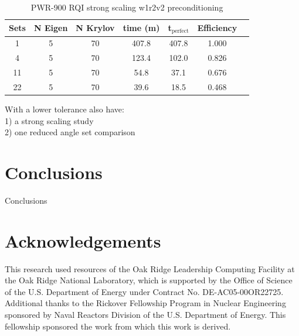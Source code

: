 \documentclass[preprint,12pt]{elsarticle}
\begin{document}
\begin{table}[!h]
\caption{PWR-900 RQI strong scaling w1r2v2 preconditioning}
\label{tab:PWR rqi strong scaling}
  \begin{center}
    \begin{tabular}{| c | c | c | c | c | c | c |}
     \hline
      Sets & N Eigen & N Krylov & time (m) & t$_{\text{perfect}}$ & Efficiency \\\hline
      1   & 5 & 70 & 407.8 & 407.8 & 1.000 \\
      4   & 5 & 70 & 123.4 & 102.0 & 0.826\\
      11  & 5 & 70 & 54.8  & 37.1  & 0.676\\
      22  & 5 & 70 & 39.6  & 18.5  & 0.468\\
      \hline
    \end{tabular}
  \end{center}
\end{table}

With a lower tolerance also have: \\
1) a strong scaling study \\
2) one reduced angle set comparison


\section{Conclusions}
\label{sec:conclusions}

Conclusions


\section{Acknowledgements}

This research used resources of the Oak Ridge Leadership Computing Facility at the Oak Ridge National Laboratory, which is supported by the Office of Science of the U.S. Department of Energy under Contract No. DE-AC05-00OR22725. Additional thanks to the Rickover Fellowship Program in Nuclear Engineering sponsored by Naval Reactors Division of the U.S. Department of Energy. This fellowship sponsored the work from which this work is derived. 

\end{document}
